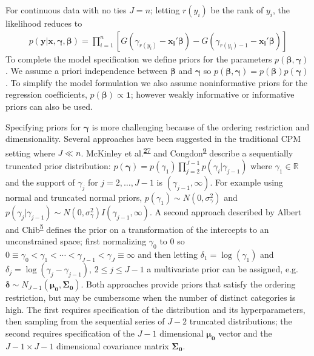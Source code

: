 \documentclass[
]{article}
\begin{document}
For continuous data with no ties \(J=n\); letting \(r(y_i)\) be the rank of \(y_i\), the likelihood reduces to
\begin{gather}
p(\boldsymbol{y}|\boldsymbol{x},\boldsymbol{\gamma},\boldsymbol{\beta})=
\prod_{i=1}^{n}[G(\gamma_{r(y_i)}-\boldsymbol{x_i'\beta})-G(\gamma_{r(y_i)-1}-\boldsymbol{x_i'\beta})]
\end{gather}
To complete the model specification we define priors for the parameters \(p(\boldsymbol{\beta},\boldsymbol{\gamma})\). We assume a priori independence between \(\boldsymbol{\beta}\) and \(\boldsymbol{\gamma}\) so \(p(\boldsymbol{\beta},\boldsymbol{\gamma})=p(\boldsymbol{\beta})p(\boldsymbol{\gamma})\). To simplify the model formulation we also assume noninformative priors for the regression coefficients, \(p(\boldsymbol{\beta}) \propto \boldsymbol{1}\); however weakly informative or informative priors can also be used.

Specifying priors for \(\boldsymbol{\gamma}\) is more challenging because of the ordering restriction and dimensionality. Several approaches have been suggested in the traditional CPM setting where \(J \ll n\). McKinley et al.\textsuperscript{\protect\hyperlink{ref-mckinley_bayesian_2015}{27}} and Congdon\textsuperscript{\protect\hyperlink{ref-congdon_bayesian_2005}{9}} describe a sequentially truncated prior distribution: \(p(\boldsymbol{\gamma})=p(\gamma_1)\prod_{j=2}^{J-1}p(\gamma_i|\gamma_{j-1})\) where \(\gamma_1 \in \mathbb{R}\) and the support of \(\gamma_j\) for \(j=2,\ldots, J-1\) is \((\gamma_{j-1},\infty)\). For example using normal and truncated normal priors, \(p(\gamma_1)\sim N(0, \sigma_\gamma^2)\) and \(p(\gamma_j|\gamma_{j-1}) \sim N(0, \sigma_\gamma^2)I(\gamma_{j-1},\infty)\). A second approach described by Albert and Chib\textsuperscript{\protect\hyperlink{ref-albert_bayesian_1997}{5}} defines the prior on a transformation of the intercepts to an unconstrained space; first normalizing \(\gamma_0\) to 0 so \(0 \equiv \gamma_0 < \gamma_1 < \cdots < \gamma_{J-1} <\gamma_J \equiv \infty\) and then letting \(\delta_1=\log(\gamma_1)\) and \(\delta_j=\log(\gamma_j - \gamma_{j-1}),\, 2 \le j \le J-1\) a multivariate prior can be assigned, e.g.~\(\boldsymbol{\delta} \sim N_{J-1}(\boldsymbol{\mu_0},\boldsymbol{\Sigma_0})\).
Both approaches provide priors that satisfy the ordering restriction, but may be cumbersome when the number of distinct categories is high. The first requires specification of the distribution and its hyperparameters, then sampling from the sequential series of \(J-2\) truncated distributions; the second requires specification of the \(J-1\) dimensional \(\boldsymbol{\mu_0}\) vector and the \(J-1 \times J-1\) dimensional covariance matrix \(\boldsymbol{\Sigma_0}\).
\end{document}
